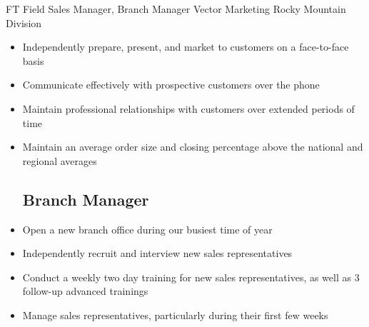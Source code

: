     {FT} %
    {Field Sales Manager, Branch Manager} %
    {Vector Marketing} %
    {Rocky Mountain Division}
    {\begin{itemize}
    \setlength\itemsep{0.1em}
        \subsection*{Field Sales}
            \item Independently prepare, present, and market to customers on a face-to-face basis
            \item Communicate effectively with prospective customers over the phone
            \item Maintain professional relationships with customers over extended periods of time
            \item Maintain an average order size and closing percentage above the national and regional averages
        \subsection*{Branch Manager}
            \item Open a new branch office during our busiest time of year
            \item Independently recruit and interview new sales representatives
            \item Conduct a weekly two day training for new sales representatives, as well as 3 follow-up advanced trainings
\item Manage sales representatives, particularly during their first few weeks
    \end{itemize}
}